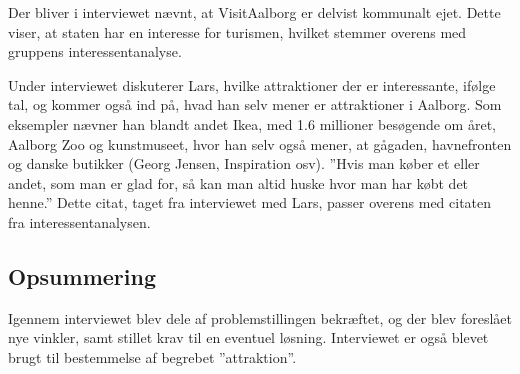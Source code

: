 Der bliver i interviewet nævnt, at VisitAalborg er delvist kommunalt ejet. Dette viser, at staten har en interesse for turismen, hvilket stemmer overens med gruppens interessentanalyse.

Under interviewet diskuterer Lars, hvilke attraktioner der er interessante, ifølge tal, og kommer også ind på, hvad han selv mener er attraktioner i Aalborg. Som eksempler nævner han blandt andet Ikea, med 1.6 millioner besøgende om året, Aalborg Zoo og kunstmuseet, hvor han selv også mener, at gågaden, havnefronten og danske butikker (Georg Jensen, Inspiration osv). ”Hvis man køber et eller andet, som man er glad for, så kan man altid huske hvor man har købt det henne.” Dette citat, taget fra interviewet med Lars, passer overens med citaten fra interessentanalysen.
\subsection{Opsummering}
Igennem interviewet blev dele af problemstillingen bekræftet, og der blev foreslået nye vinkler, samt stillet krav til en eventuel løsning. Interviewet er også blevet brugt til bestemmelse af begrebet ”attraktion”. 
